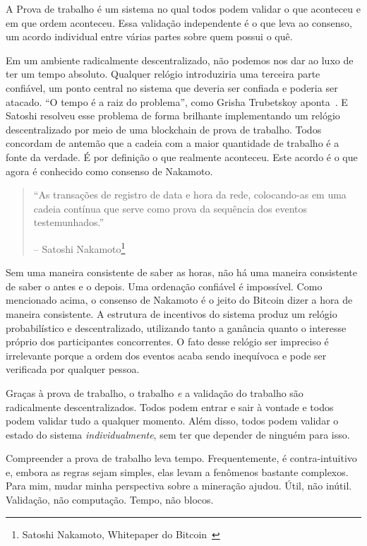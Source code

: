 A Prova de trabalho é um sistema no qual todos podem validar o que aconteceu e em que ordem aconteceu. Essa validação independente é o que leva ao consenso, um acordo individual entre várias partes sobre quem possui o quê.

Em um ambiente radicalmente descentralizado, não podemos nos dar ao luxo de ter um tempo absoluto. Qualquer relógio introduziria uma terceira parte confiável, um ponto central no sistema que deveria ser confiada e poderia ser atacado. \enquote{O tempo é a raiz do problema}, como Grisha Trubetskoy aponta~\cite{pow-clock}. E Satoshi resolveu esse problema de forma brilhante implementando um relógio descentralizado por meio de uma blockchain de prova de trabalho. Todos concordam de antemão que a cadeia com a maior quantidade de trabalho é a fonte da verdade. É por definição o que realmente aconteceu. Este acordo é o que agora é conhecido como consenso de Nakamoto.

\begin{quotation}\begin{samepage}
\enquote{As transações de registro de data e hora da rede, colocando-as em uma cadeia contínua que serve como prova da sequência dos eventos testemunhados.}
\begin{flushright} -- Satoshi Nakamoto\footnote{Satoshi Nakamoto, Whitepaper do Bitcoin~\cite{whitepaper}}
\end{flushright}\end{samepage}\end{quotation}

Sem uma maneira consistente de saber as horas, não há uma maneira consistente de saber o antes e o depois. Uma ordenação confiável é impossível. Como mencionado acima, o consenso de Nakamoto é o jeito do Bitcoin dizer a hora de maneira consistente. A estrutura de incentivos do sistema produz um relógio probabilístico e descentralizado, utilizando tanto a ganância quanto o interesse próprio dos participantes concorrentes. O fato desse relógio ser impreciso é irrelevante porque a ordem dos eventos acaba sendo inequívoca e pode ser verificada por qualquer pessoa.

Graças à prova de trabalho, o trabalho \textit{e} a validação do trabalho são radicalmente descentralizados. Todos podem entrar e sair à vontade e todos podem validar tudo a qualquer momento. Além disso, todos podem validar o estado do sistema \textit{individualmente}, sem ter que depender de ninguém para isso.

Compreender a prova de trabalho leva tempo. Frequentemente, é contra-intuitivo e, embora as regras sejam simples, elas levam a fenômenos bastante complexos. Para mim, mudar minha perspectiva sobre a mineração ajudou. Útil, não inútil. Validação, não computação. Tempo, não blocos.

